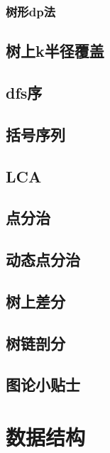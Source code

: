\documentclass{probook}
\begin{document}
\subsection{树形dp法}

\section{树上k半径覆盖}

\section{dfs序}

\section{括号序列}

\section{LCA}
 
\section{点分治}

\section{动态点分治}

\section{树上差分}

\section{树链剖分} 

\section{图论小贴士} 



\chapter{数据结构} 
\end{document}
